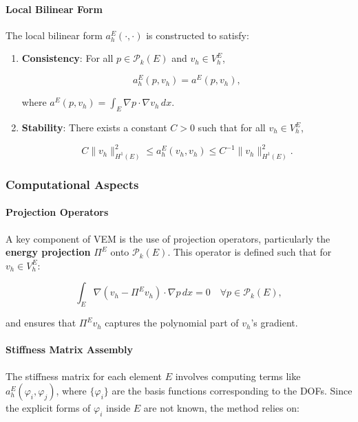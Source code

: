 \documentclass[class=article, crop=false]{standalone}
\begin{document}
\paragraph{Local Bilinear Form}

The local bilinear form $a_h^E(\cdot, \cdot)$ is constructed to satisfy:

\begin{enumerate}
    \item \textbf{Consistency}: For all $p \in \mathcal{P}_k(E)$ and $v_h \in V_h^E$,

    \[
    a_h^E(p, v_h) = a^E(p, v_h),
    \]

    where $a^E(p, v_h) = \int_E \nabla p \cdot \nabla v_h \, dx$.
    \item \textbf{Stability}: There exists a constant $C > 0$ such that for all $v_h \in V_h^E$,

    \[
    C \| v_h \|_{H^1(E)}^2 \leq a_h^E(v_h, v_h) \leq C^{-1} \| v_h \|_{H^1(E)}^2.
    \]
\end{enumerate}

\subsubsection{Computational Aspects}

\paragraph{Projection Operators}

A key component of VEM is the use of projection operators, particularly the \textbf{energy projection} $\Pi^E$ onto $\mathcal{P}_k(E)$. This operator is defined such that for $v_h \in V_h^E$:

\[
\int_E \nabla (v_h - \Pi^E v_h) \cdot \nabla p \, dx = 0 \quad \forall p \in \mathcal{P}_k(E),
\]

and ensures that $\Pi^E v_h$ captures the polynomial part of $v_h$'s gradient.

\paragraph{Stiffness Matrix Assembly}

The stiffness matrix for each element $E$ involves computing terms like $a_h^E(\varphi_i, \varphi_j)$, where $\{ \varphi_i \}$ are the basis functions corresponding to the DOFs. Since the explicit forms of $\varphi_i$ inside $E$ are not known, the method relies on:
\end{document}

